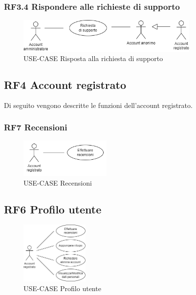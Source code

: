 \documentclass[a4paper,12pt]{article}
\begin{document}
\subsubsection*{RF3.4 Rispondere alle richieste di supporto}

\begin{figure}[H]
   \centering
   \includegraphics[width=0.8\textwidth]{img-D2/richiesta_supporto_amministratore.png}
    \caption{USE-CASE Risposta alla richiesta di supporto}
\end{figure}




\subsection*{RF4 Account registrato}

Di seguito vengono descritte le funzioni dell'account registrato.

\subsubsection*{RF7 Recensioni}
\begin{figure}[H]
   \centering
   \includegraphics[width=0.4\textwidth]{img-D2/recensioni_registrato.png}
    \caption{USE-CASE Recensioni}
\end{figure}
 
\subsection*{RF6 Profilo utente}
\begin{figure}[H]
   \centering   \includegraphics[width=0.3\textwidth]{img-D2/profilo_utente.png}
    \caption{USE-CASE Profilo utente}
\end{figure}
\end{document}
